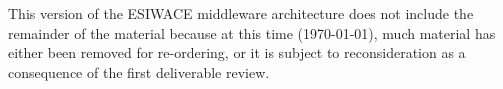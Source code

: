
\vspace*{1cm}

\begin{tcolorbox}[colback=red!5!white,colframe=red,title=Incomplete Document]
This version of the ESIWACE middleware architecture does not include the remainder of the material because at this time (\today), much material has either been removed for re-ordering, or it is subject to reconsideration as a consequence of the first deliverable review.
\end{tcolorbox}
\newpage
